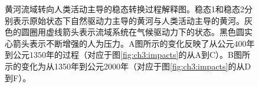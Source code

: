 \begin{figure}[htb] %
    \caption[黄河流域转向人类活动主导的稳态转换过程解释图]{黄河流域转向人类活动主导的稳态转换过程解释图。稳态1和稳态2分别表示原始状态下自然驱动力主导的黄河与人类活动主导的黄河。灰色的圆圈用虚线箭头表示流域系统在气候驱动力下的状态。黑色圆实心箭头表示不断增强的人为压力。A图所示的变化反映了从公元$400$年到公元$1350$年的过程（对应于图\ref{fig:ch3:impacts}的从A到C）。B图所示的变化为从1350年到公元2000年（对应于图\ref{fig:ch3:impacts}的从D到F）。}\label{fig:ch3:regime_shift}
\end{figure}

